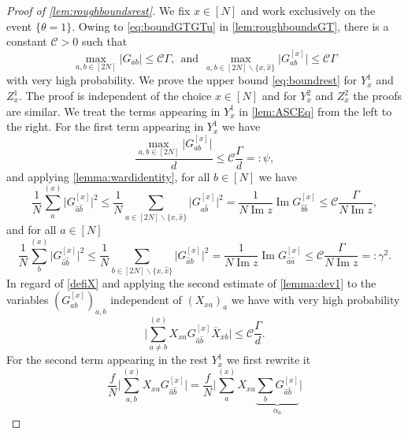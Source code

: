 \documentclass[10pt,a4paper]{amsart}
\DeclareMathOperator{\Ima}{Im}
\newcommand{\abs}[1]{\left| #1 \right|}
\newcommand{\absb}[1]{\bigl| #1 \bigr|}
\newcommand{\absbb}[1]{\biggl| #1 \biggr|}
\numberwithin{equation}{section}
\newcommand*\barr[1]{\overline{#1}}
\newcommand*\bset[1]{[#1]}
\newcommand*\ubarr[1]{{\widehat{#1}}}
\begin{document}
	
\begin{proof}[Proof of \cref{lem:roughboundsrest}]
		We fix $x \in [N]$ and work exclusively on the event $\{\theta=1\}$. Owing to  \cref{eq:boundGTGTu} in \cref{lem:roughboundsGT}, there is a constant $\mathcal{C}>0$ such that 
		\begin{equation*}
			\max_{a,b \in [2N]} \abs{G_{ab}} \le \mathcal{C} \Gamma,~~\text{and}~~\max_{a,b \in [2N]\backslash\{x,\ubarr{x}\}} \absb{G_{ab}^{\bset{x}}} \le \mathcal{C} \Gamma
		\end{equation*}
		with very high probability. 
		We prove the upper bound \cref{eq:boundrest} for $Y^{1}_{x}$ and $Z^{1}_x$. The proof is independent of the choice $x \in [N]$ and for $Y^2_x$ and $Z^{2}_x$ the proofs are similar. We treat the terms appearing in $Y_{x}^1$ in \cref{lem:ASCEq} from the left to the right. For the first term appearing in $Y_{x}^1$ we have
		\begin{equation*}
			\frac{\max_{a,b \in [2N]} \absb{G^{\bset{x}}_{ab}}}{d} \le\mathcal{C} \frac{\Gamma}{d}   =: \psi,
		\end{equation*}
		and applying \cref{lemma:wardidentity}, for all $b\in [N]$ we have
		\begin{equation*}
			\frac{1}{N}\sum_{a}^{(x)}\absb{G_{\ubarr{a}\ubarr{b}}^{\bset{x}}}^2\le \frac{1}{N}\sum_{a \in [2N] \backslash\{x,\ubarr{x}\}}\absb{G_{a\ubarr{b}}^{\bset{x}}}^2= \frac{1}{N\Ima z} \Ima G_{\ubarr{b}\ubarr{b}}^{\bset{x}} \le  \mathcal{C}\frac{\Gamma}{N\Ima z} ,
		\end{equation*}
		and for all $a \in [N]$
		\begin{equation*}
			\frac{1}{N}\sum_{b}^{(x)}\absb{G_{\ubarr{a}\ubarr{b}}^{\bset{x}}}^2\le \frac{1}{N}\sum_{b \in [2N] \backslash\{x,\ubarr{x}\}}\absb{G_{\ubarr{a}b}^{\bset{x}}}^2= \frac{1}{N\Ima z} \Ima G_{\ubarr{a}\ubarr{a}}^{\bset{x}}  \le  \mathcal{C}\frac{\Gamma}{N\Ima z} =: \gamma^2.
		\end{equation*}
		In regard of \cref{defiX} and applying the second estimate of \cref{lemma:dev1} to the variables $(G_{ab}^{\bset{x}})_{a,b}$ independent of $(X_{xa})_{a}$ we have with very high probability 
		\begin{equation}
			\absbb{ \sum_{a\neq b}^{(x)} X_{xa} G_{\ubarr{a}\ubarr{b}}^{\bset{x}} \barr{X}_{xb} } \le \mathcal{C} \frac{\Gamma}{d}.
		\end{equation}
		For the second term appearing in the rest $Y^{1}_x$ we first rewrite it
		\begin{equation*}
			\frac{f}{N} \absbb{ \sum_{a,b}^{(x)} X_{xa} G^{\bset{x}}_{\ubarr{a}\ubarr{b}}} = \frac{f}{N}\absbb{ \sum_{a}^{(x)} X_{xa} \underbrace{\sum_{b}  G^{\bset{x}}_{\ubarr{a}\ubarr{b}}}_{\alpha_a}}

\end{equation*}
\end{proof}
\end{document}
